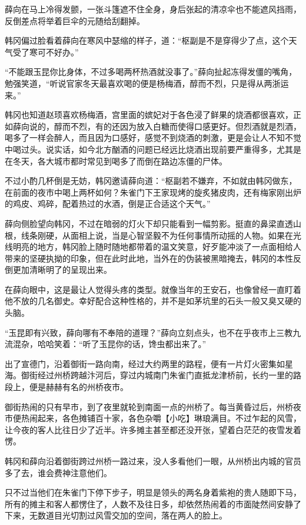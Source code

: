 薛向在马上冷得发颤，一张斗篷遮不住全身，身后张起的清凉伞也不能遮风挡雨，反倒差点将举着巨伞的元随给刮翻掉。

韩冈偏过脸看着薛向在寒风中瑟缩的样子，道：“枢副是不是穿得少了点，这个天气受了寒可不好办。”

“不能跟玉昆你比身体，不过多喝两杯热酒就没事了。”薛向扯起冻得发僵的嘴角，勉强笑道，“听说官家冬天最喜欢喝的便是杨梅酒，醇而不烈，只是得从两浙运来。”

韩冈也知道赵顼喜欢杨梅酒，宫里面的嫔妃对于各色浸了鲜果的烧酒都很喜欢，正如薛向说的，醇而不烈，有的还因为放入白糖而使得口感更好。但烈酒就是烈酒，喝多了一样会醉人，而且因为口感好，感觉不到烧酒的刺激，更是会让人不知不觉中喝过头。说实话，如今北方酗酒的问题已经远比烧酒出现前要严重得多，尤其是在冬天，各大城市都时常见到喝多了而倒在路边冻僵的尸体。

不过小酌几杯倒是无妨，韩冈邀请薛向道：“枢副若不嫌弃，不如就由韩冈做东，在前面的夜市中喝上两杯如何？朱雀门下王家现烤的旋炙猪皮肉，还有梅家刚出炉的鸡皮、鸡碎，配着热过的水酒，倒是正合适这个天气。”

薛向侧脸望向韩冈，不过在暗弱的灯火下却只能看到一幅剪影。挺直的鼻梁直透山根，线条刚硬，从面相上说，当是心智坚毅不为任何事情所动摇的人物。如果在光线明亮的地方，韩冈脸上随时随地都带着的温文笑意，好歹能冲淡了一点面相给人带来的坚硬执拗的印象，但在此时此地，当外在的伪装被黑暗掩去，韩冈的本性反倒更加清晰明了的呈现出来。

在薛向眼中，这是最让人觉得头疼的类型。就像当年的王安石，也像曾经一直盯着他不放的几名御史。幸好配合这种性格的，并不是如茅坑里的石头一般又臭又硬的头脑。

“玉昆即有兴致，薛向哪有不奉陪的道理？”薛向立刻点头，也不在乎夜市上三教九流混杂，哈哈笑着：“听了玉昆你的话，馋虫都出来了。”

出了宣德门，沿着御街一路向南，经过大约两里的路程，便有一片灯火密集如星海。御街经过州桥跨越汴河后，穿过内城南门朱雀门直抵龙津桥前，长约一里的路段上，便是赫赫有名的州桥夜市。

御街热闹的只有早市，到了夜里就轮到南面一点的州桥了。每当黄昏过后，州桥夜市便热闹起来，各色摊铺百十家，各色杂嚼【小吃】琳琅满目。不过乍起的风雪，让今夜的客人比往日少了近半。许多摊主甚至都还没开张，望着白茫茫的夜雪发着愣。

韩冈和薛向沿着御街跨过州桥一路过来，没人多看他们一眼，从州桥出内城的官员多了去，谁会费神注意他们。

只不过当他们在朱雀门下停下步子，明显是领头的两名身着紫袍的贵人随即下马，所有的摊主和客人都愣住了，人数不及往日多，却依然热闹着的市面陡然间安静了下来，无数道目光切割过风雪交加的空间，落在两人的脸上。

